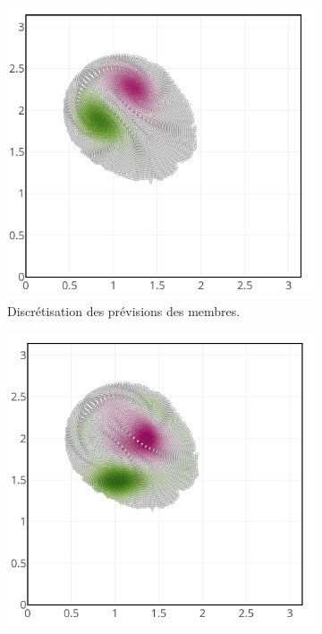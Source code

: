 \begin{figure}
    \centering
    \begin{subfigure}{0.32\textwidth}
        \centering
        \includegraphics[width=\linewidth]{./images/app2d/assim_member_forecast.png}
        \caption{Discrétisation des prévisions des membres.}
    \end{subfigure}
    \hfill
    \begin{subfigure}{0.32\textwidth}
        \centering
        \includegraphics[width=\linewidth]{./images/app2d/assim_member_ppf.png}

\end{subfigure}
\end{figure}

